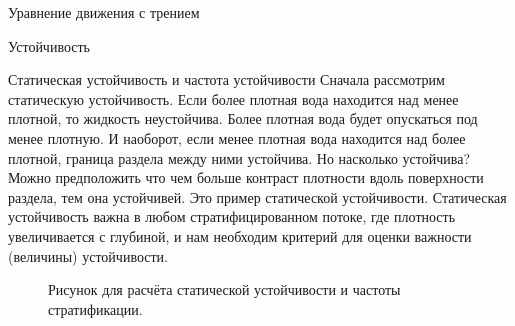 \begin{chapter}{Уравнение движения с трением}
\begin{section}{Устойчивость}
\begin{paragraph}{Статическая устойчивость и частота устойчивости}
Сначала рассмотрим статическую устойчивость. Если более плотная вода
находится над менее плотной, то жидкость неустойчива. Более плотная
вода будет опускаться под менее плотную. И наоборот, если менее
плотная вода находится над более плотной, граница раздела между ними
устойчива. Но насколько устойчива? Можно предположить что чем больше
контраст плотности вдоль поверхности раздела, тем она устойчивей. Это
пример статической устойчивости. Статическая устойчивость важна в
любом стратифицированном потоке, где плотность увеличивается с
глубиной, и нам необходим критерий для оценки важности (величины)
устойчивости.
%

\begin{figure}[b!]
\caption{Рисунок для расчёта статической устойчивости и частоты
стратификации.}
\label{fig:stabilitysketch}
\end{figure}
%
%


\end{paragraph}
\end{section}
\end{chapter}
